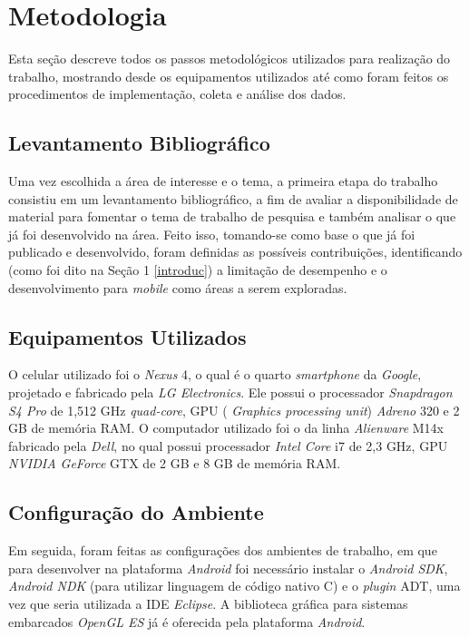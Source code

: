 \chapter[Metodologia]{Metodologia}

	Esta seção descreve todos os passos metodológicos utilizados para realização do trabalho, mostrando desde os equipamentos utilizados até como foram feitos os procedimentos de implementação, coleta e análise dos dados. 

\section{Levantamento Bibliográfico}

Uma vez escolhida a área de interesse e o tema, a primeira etapa do trabalho consistiu em um levantamento bibliográfico, a fim de avaliar a disponibilidade de material para fomentar o tema de trabalho de pesquisa e também analisar o que já foi desenvolvido na área. Feito isso, tomando-se como base o que já foi publicado e desenvolvido, foram definidas as possíveis contribuições, identificando (como foi dito na Seção 1 \ref{introduc}) a limitação de desempenho e o desenvolvimento para \textit{mobile} como áreas a serem exploradas.  

\section{Equipamentos Utilizados}

O celular utilizado foi o \textit{Nexus} 4, o qual é o quarto  \textit{smartphone} da  \textit{Google}, projetado e fabricado pela \textit{LG Electronics}.  Ele possui o processador \textit{Snapdragon S4 Pro} de 1,512 GHz \textit{quad-core}, GPU ( \textit{Graphics processing unit}) \textit{Adreno} 320 e 2 GB de memória RAM. O computador utilizado foi o da linha \textit{Alienware} M14x fabricado pela \textit{Dell}, no qual possui processador \textit{Intel Core} i7 de 2,3 GHz, GPU \textit{NVIDIA GeForce} GTX de 2 GB e 8 GB de memória RAM. 

\section{Configuração do Ambiente}
\label{configamb}	

	Em seguida, foram feitas as configurações dos ambientes de trabalho, em que  para desenvolver na plataforma \textit{Android} foi necessário instalar o \textit{Android SDK}, \textit{Android NDK} (para utilizar linguagem de código nativo C) e o \textit{plugin} ADT, uma vez que seria utilizada a IDE \textit{Eclipse}. A biblioteca gráfica para sistemas embarcados \textit{OpenGL ES} já é oferecida pela plataforma \textit{Android}. 

